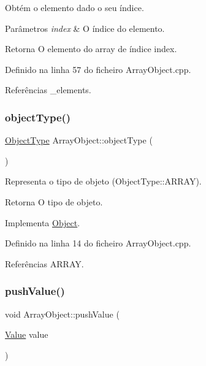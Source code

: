 Obtém o elemento dado o seu índice. 


\begin{DoxyParams}{Parâmetros}
{\em index} & O índice do elemento. \\
\hline
\end{DoxyParams}
\begin{DoxyReturn}{Retorna}
O elemento do array de índice index. 
\end{DoxyReturn}


Definido na linha 57 do ficheiro Array\+Object.\+cpp.



Referências \+\_\+elements.

\mbox{\label{classArrayObject_a63034d166dcd6caad9261c86c338a417}} 
\subsubsection{\texorpdfstring{object\+Type()}{objectType()}}
{\footnotesize\ttfamily \hyperlink{BasicTypes_8h_a842c5e2e69277690b064bf363c017980}{Object\+Type} Array\+Object\+::object\+Type (\begin{DoxyParamCaption}{ }\end{DoxyParamCaption})\hspace{0.3cm}{\ttfamily [virtual]}}



Representa o tipo de objeto (Object\+Type\+::\+A\+R\+R\+AY). 

\begin{DoxyReturn}{Retorna}
O tipo de objeto. 
\end{DoxyReturn}


Implementa \hyperlink{classObject_a08cee945bc224fc81f4448086625183d}{Object}.



Definido na linha 14 do ficheiro Array\+Object.\+cpp.



Referências A\+R\+R\+AY.

\mbox{\label{classArrayObject_a3f6f6445f0598bace2e29b338838333f}} 
\subsubsection{\texorpdfstring{push\+Value()}{pushValue()}}
{\footnotesize\ttfamily void Array\+Object\+::push\+Value (\begin{DoxyParamCaption}\item[{\hyperlink{structValue}{Value}}]{value }\end{DoxyParamCaption})}



